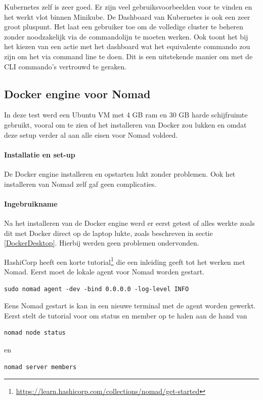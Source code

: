 Kubernetes zelf is zeer goed. Er zijn veel gebruiksvoorbeelden voor te vinden en het werkt vlot binnen Minikube. De Dashboard van Kubernetes is ook een zeer groot pluspunt. Het laat een gebruiker toe om de volledige cluster te beheren zonder noodzakelijk via de commandolijn te moeten werken. Ook toont het bij het kiezen van een actie met het dashboard wat het equivalente commando zou zijn om het via command line te doen. Dit is een uitstekende manier om met de CLI commando’s vertrouwd te geraken.


\subsection{Docker engine voor Nomad}
In deze test werd een Ubuntu VM met 4 GB ram en 30 GB harde schijfruimte gebruikt, vooral om te zien of het installeren van Docker zou lukken en omdat deze setup verder al aan alle eisen voor Nomad voldeed.
\paragraph{Installatie en set-up}
De Docker engine installeren en opstarten lukt zonder problemen. Ook het installeren van Nomad zelf gaf geen complicaties.
\paragraph{Ingebruikname}
Na het installeren van de Docker engine werd er eerst getest of alles werkte zoals dit met Docker direct op de laptop lukte, zoals beschreven in sectie \ref{DockerDesktop}. Hierbij werden geen problemen ondervonden.

HashiCorp heeft een korte tutorial\footnote{\url{https://learn.hashicorp.com/collections/nomad/get-started}} die een inleiding geeft tot het werken met Nomad. Eerst moet de lokale agent voor Nomad worden gestart.
\begin{verbatim}
sudo nomad agent -dev -bind 0.0.0.0 -log-level INFO
\end{verbatim}
Eens Nomad gestart is kan in een nieuwe terminal met de agent worden gewerkt. Eerst stelt de tutorial voor om status en member op te halen aan de hand van
\begin{verbatim}
nomad node status
\end{verbatim}
en
\begin{verbatim}
nomad server members
\end{verbatim}

